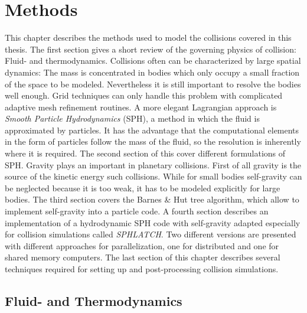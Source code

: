 \cleardoublepage
\chapter{Methods}
\graphicspath{{./02figs/}}
\label{ch02}
This chapter describes the methods used to model the collisions covered in this thesis. The first section gives a short review of the governing physics of collision: Fluid- and thermodynamics.  Collisions often can be characterized by large spatial dynamics: The mass is concentrated in bodies which only occupy a small fraction of the space to be modeled. Nevertheless it is still important to resolve the bodies well enough. Grid techniques can only handle this problem with complicated adaptive mesh refinement routines. 
A more elegant Lagrangian approach is \emph{Smooth Particle Hydrodynamics} (SPH), a method in which the fluid is approximated by particles. It has the advantage that the computational elements in the form of particles follow the mass of the fluid, so the resolution is inherently where it is required. The second section of this cover different formulations of SPH.
Gravity plays an important in planetary collisions. First of all gravity is the source of the kinetic energy such collisions. While for small bodies self-gravity can be neglected because it is too weak, it has to be modeled explicitly for large bodies. The third section covers the Barnes \& Hut tree algorithm, which allow to implement self-gravity into a particle code.
A fourth section describes an implementation of a hydrodynamic SPH code with self-gravity adapted especially for collision simulations called \emph{SPHLATCH}. Two different versions are presented with different approaches for parallelization, one for distributed and one for shared memory computers.
The last section of this chapter describes several techniques required for setting up and post-processing collision simulations.

\newpage

\section{Fluid- and Thermodynamics}
